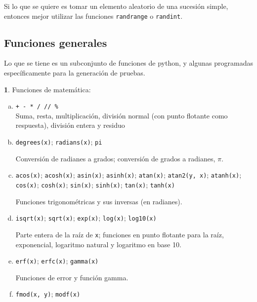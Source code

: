\documentclass[12pt]{article}
\theoremstyle{definition}
\newtheorem{funcion}{}[section]
\begin{document}
Si lo que se quiere es tomar un elemento aleatorio de una sucesión simple, entonces mejor utilizar las funciones \verb|randrange| o \verb|randint|. 

\subsection{Funciones generales}
Lo que se tiene es un subconjunto de funciones de python, y algunas programadas espec\'ificamente para la generaci\'on de pruebas.


\begin{funcion}
  Funciones de matem\'atica:
  \begin{enumerate}[a)]
    \item \verb|+ - * / // %| \\[1ex]
  Suma, resta, multiplicaci\'on, divisi\'on normal (con punto flotante como respuesta), divisi\'on entera y residuo

    \item \verb|degrees(x)|; \verb|radians(x)|; \verb|pi|

      Conversi\'on de radianes a grados; conversi\'on de grados a radianes, $\pi$.

\item \verb|acos(x)|;
      \verb|acosh(x)|;
      \verb|asin(x)|;
      \verb|asinh(x)|;
      \verb|atan(x)|;
      \verb|atan2(y, x)|;
      \verb|atanh(x)|;
      \verb|cos(x)|;
      \verb|cosh(x)|;
      \verb|sin(x)|;
      \verb|sinh(x)|;
      \verb|tan(x)|;
      \verb|tanh(x)|

      Funciones trigonom\'etricas y sus inversas (en radianes).

\item \verb|isqrt(x)|; \verb|sqrt(x)|; \verb|exp(x)|; \verb|log(x)|; \verb|log10(x)|

  Parte entera de la ra\'iz de \verb|x|; funciones en punto flotante para la ra\'iz, exponencial, logaritmo natural y logaritmo en base 10.

    \item \verb|erf(x)|; \verb|erfc(x)|; \verb|gamma(x)|

      Funciones de error y funci\'on gamma.

    \item \verb|fmod(x, y)|; \verb|modf(x)|
      

\end{enumerate}
\end{funcion}
\end{document}
